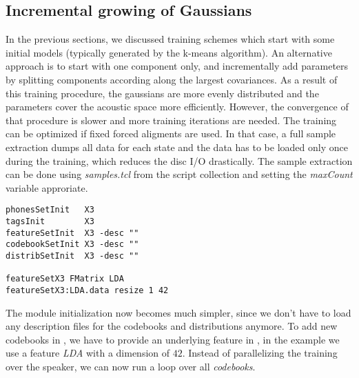 \subsection{Incremental growing of Gaussians}

In  the previous sections, we   discussed training schemes which start
with some   initial  models   (typically  generated  by  the   k-means
algorithm). An alternative approach is to start with one component only, and
incrementally add parameters  by  splitting  components  according along the
largest   covariances. As a   result of  this  training procedure, the
gaussians are  more evenly  distributed and  the parameters  cover the
acoustic  space  more efficiently. However,   the  convergence of that
procedure is  slower  and more   training iterations are  needed.  The
training can be optimized if fixed forced aligments  are used. In that
case, a full  sample extraction dumps all  data for each state and the
data has to be loaded only once during the training, which reduces the
disc  I/O drastically.  The  sample  extraction can  be done using {\em
samples.tcl} from the script collection and setting the {\em maxCount}
variable approriate.

\begin{verbatim}
phonesSetInit   X3
tagsInit        X3
featureSetInit  X3 -desc ""
codebookSetInit X3 -desc ""
distribSetInit  X3 -desc ""

featureSetX3 FMatrix LDA
featureSetX3:LDA.data resize 1 42
\end{verbatim}

The module initialization  now becomes much   simpler, since we  don't
have to load any description files for the codebooks and distributions
anymore.  To add new codebooks  in , we have
to provide an  underlying feature in , in the
example we use a  feature {\em LDA} with  a dimension of $42$. Instead
of parallelizing the training over the speaker, we can  now run a loop
over all {\em codebooks}.

